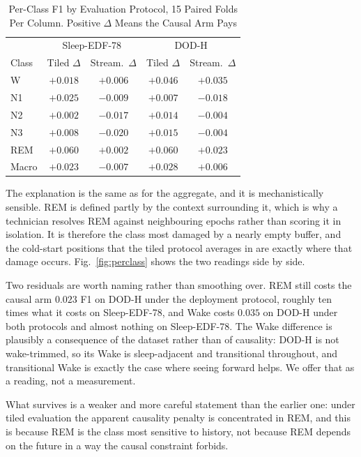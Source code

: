 \documentclass[conference]{IEEEtran}
\begin{document}
\begin{table}[t]
\caption{Per-Class F1 by Evaluation Protocol, 15 Paired Folds Per Column. Positive $\Delta$ Means
the Causal Arm Pays}
\label{tab:perclass}
\centering
\footnotesize
\setlength{\tabcolsep}{3.2pt}
\begin{tabular}{lcc|cc}
\toprule
 & \multicolumn{2}{c|}{Sleep-EDF-78} & \multicolumn{2}{c}{DOD-H} \\
Class & Tiled $\Delta$ & Stream.\ $\Delta$ & Tiled $\Delta$ & Stream.\ $\Delta$ \\
\midrule
W   & $+0.018$ & $+0.006$ & $+0.046$ & $+0.035$ \\
N1  & $+0.025$ & $-0.009$ & $+0.007$ & $-0.018$ \\
N2  & $+0.002$ & $-0.017$ & $+0.014$ & $-0.004$ \\
N3  & $+0.008$ & $-0.020$ & $+0.015$ & $-0.004$ \\
REM & $\mathbf{+0.060}$ & $\mathbf{+0.002}$ & $\mathbf{+0.060}$ & $\mathbf{+0.023}$ \\
\midrule
Macro & $+0.023$ & $-0.007$ & $+0.028$ & $+0.006$ \\
\bottomrule
\end{tabular}
\end{table}

The explanation is the same as for the aggregate, and it is mechanistically sensible. REM is defined
partly by the context surrounding it, which is why a technician resolves REM against neighbouring
epochs rather than scoring it in isolation. It is therefore the class most damaged by a nearly empty
buffer, and the cold-start positions that the tiled protocol averages in are exactly where that
damage occurs. Fig.~\ref{fig:perclass} shows the two readings side by side.

Two residuals are worth naming rather than smoothing over. REM still costs the causal arm $0.023$ F1
on DOD-H under the deployment protocol, roughly ten times what it costs on Sleep-EDF-78, and Wake
costs $0.035$ on DOD-H under both protocols and almost nothing on Sleep-EDF-78. The Wake difference
is plausibly a consequence of the dataset rather than of causality: DOD-H is not wake-trimmed, so its
Wake is sleep-adjacent and transitional throughout, and transitional Wake is exactly the case where
seeing forward helps. We offer that as a reading, not a measurement.

What survives is a weaker and more careful statement than the earlier one: under tiled evaluation
the apparent causality penalty is concentrated in REM, and this is because REM is the class most
sensitive to history, not because REM depends on the future in a way the causal constraint forbids.
\end{document}
